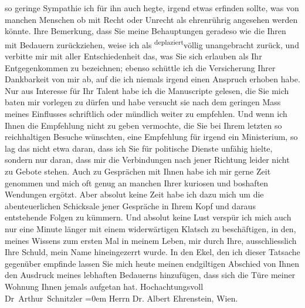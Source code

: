 \begin{ledgroupsized}[t]{13cm}
               so geringe Sympathie ich für ihn auch hegte, irgend etwas erfinden sollte, was von
               manchen Menschen ob mit Recht oder Unrecht als ehrenrührig angesehen werden könnte.
               Ihre Bemerkung, dass Sie meine Behauptungen geradeso wie die Ihren mit Bedauern
               zurückziehen, weise ich als \substVorne{}\textsuperscript{deplaziert}{\allowbreak}\substDazwischen{}völlig unangebracht\substHinten{} zurück, und verbitte mir mit aller Ent{\pb}schiedenheit
               das, was Sie sich erlauben als Ihr Entgegenkommen zu bezeichnen; ebenso schüttle ich
               die Versicherung Ihrer Dankbarkeit von mir ab, auf die ich niemals irgend einen
               Anspruch erhoben habe. Nur aus Interesse für Ihr Talent habe ich die Manuscripte
               gelesen, die Sie mich baten mir vorlegen zu dürfen und \introOben{}habe\introOben{}
               versucht sie nach dem geringen Mass meines Einflusses schriftlich oder mündlich
               weiter zu empfehlen. Und wenn ich Ihnen die Empfehlung nicht zu geben vermochte, die
               Sie bei Ihrem letzten so reichhaltigen Besuche wünschten, eine Empfehlung für irgend
               ein Ministerium, so lag das nicht etwa daran, dass ich Sie für politische Dienste
                   unfähig hielte, sondern nur daran, dass mir
               die Verbindungen nach jener Richtung leider nicht zu Gebote stehen. Auch zu
               Gesprächen mit Ihnen habe ich mir gerne Zeit genommen und mich oft genug an manchen
               Ihrer kuriosen und boshaften Wendungen ergötzt. Aber absolut keine Zeit habe ich dazu
               mich um die abenteuerlichen Schicksale jener Gespräche in Ihrem Kopf und daraus
               entstehende Fol{\pb}gen zu kümmern. Und absolut keine Lust verspür
               ich mich auch nur eine Minute länger mit einem widerwärtigen Klatsch zu beschäftigen,
               in den, meines Wissens zum ersten Mal in meinem Leben, \introOben{}mir
                  durch\introOben{} Ihre,
               ausschliesslich Ihre Schuld, mein Name hineingezerrt wurde. In den Ekel, den ich
               dieser Tatsache gegenüber empfinde lassen Sie mich heute meinen endgiltigen Abschied
               von Ihnen den Ausdruck meines lebhaften Bedauerns hinzufügen, dass sich die Türe
               meiner Wohnung Ihnen jemals aufgetan hat.\pend
           \pstart
           Hochachtungsvoll{\\[\baselineskip]}\spacefill\mbox{Dr Arthur Schnitzler}\pend
           \leftskip=0em{}\pstart
           \noindent{}Herrn Dr. Albert Ehrenstein, Wien.\pend
           
         
         \endnumbering{}\end{ledgroupsized}  \newcommand{\dateiname}{L02019}\newcommand{\titel}{Arthur Schnitzler an Albert Ehrenstein, 6. 5. 1911}\newcommand{\editorInnen}{Martin Anton Müller und Gerd-Hermann Susen}
      